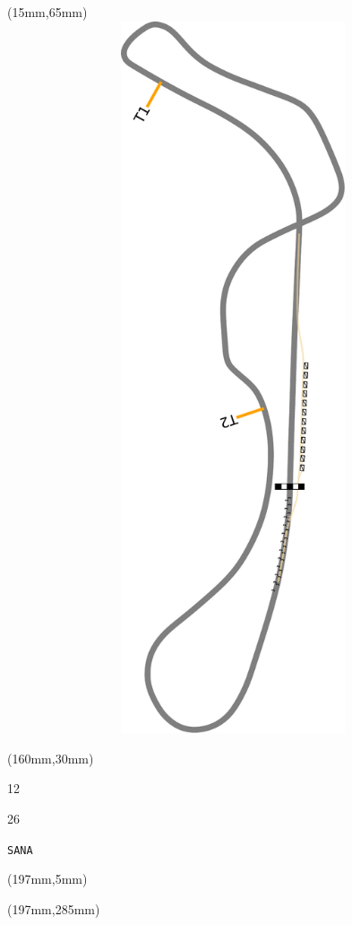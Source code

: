 \begin{textblock*}{185mm}(15mm,65mm)%
\centering
\mbox{\includegraphics[width=185mm,height=210mm,keepaspectratio]{PT/SANA.pdf}}
\end{textblock*}
\begin{textblock*}{40mm}(160mm,30mm)%
\Large
\par{} 
\par12 
\par26 
\par\hfill\tiny\tt SANA\\
\end{textblock*}
\begin{textblock*}{20mm}(197mm,5mm)%
\fbox{\thepage}
\label{SANA}
\end{textblock*}
\begin{textblock*}{20mm}(197mm,285mm)%
\fbox{\thepage}
\end{textblock*}

